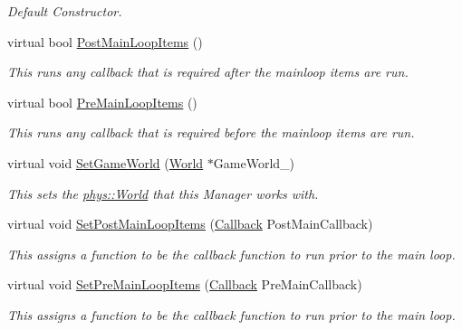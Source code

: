 \begin{DoxyCompactItemize}
\begin{DoxyCompactList}\small\item\em Default Constructor. \item\end{DoxyCompactList}\item 
virtual bool \hyperlink{classphys_1_1ManagerBase_afc3572602f96bdeb8215c386ff870820}{PostMainLoopItems} ()
\begin{DoxyCompactList}\small\item\em This runs any callback that is required after the mainloop items are run. \item\end{DoxyCompactList}\item 
virtual bool \hyperlink{classphys_1_1ManagerBase_af6210834a8af592481cf6aefa9916d88}{PreMainLoopItems} ()
\begin{DoxyCompactList}\small\item\em This runs any callback that is required before the mainloop items are run. \item\end{DoxyCompactList}\item 
virtual void \hyperlink{classphys_1_1ManagerBase_a97eb1e77c1f7a0925fc623836368a262}{SetGameWorld} (\hyperlink{classphys_1_1World}{World} $\ast$GameWorld\_\-)
\begin{DoxyCompactList}\small\item\em This sets the \hyperlink{classphys_1_1World}{phys::World} that this Manager works with. \item\end{DoxyCompactList}\item 
virtual void \hyperlink{classphys_1_1ManagerBase_a673b3adef73c467f4d90514a5133bf7c}{SetPostMainLoopItems} (\hyperlink{classphys_1_1ManagerBase_a753f5f0127131529767beab2502f480b}{Callback} PostMainCallback)
\begin{DoxyCompactList}\small\item\em This assigns a function to be the callback function to run prior to the main loop. \item\end{DoxyCompactList}\item 
virtual void \hyperlink{classphys_1_1ManagerBase_a3fcf207a451d0047f884babadd0bc53e}{SetPreMainLoopItems} (\hyperlink{classphys_1_1ManagerBase_a753f5f0127131529767beab2502f480b}{Callback} PreMainCallback)
\begin{DoxyCompactList}\small\item\em This assigns a function to be the callback function to run prior to the main loop. \item\end{DoxyCompactList}\item 

\end{DoxyCompactItemize}
